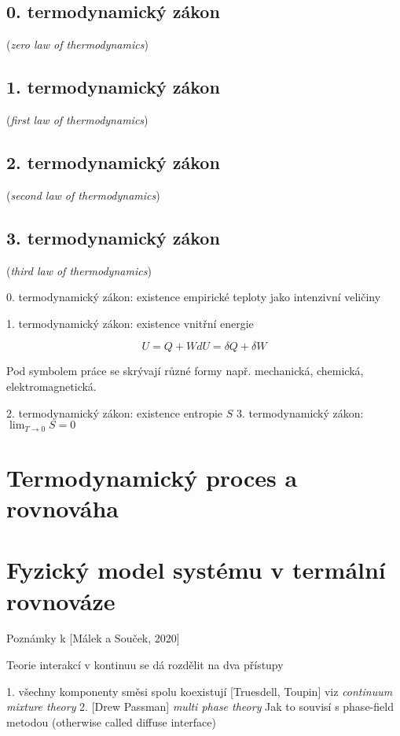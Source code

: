 \subsection{0. termodynamický zákon}

(\textit{zero law of thermodynamics})
    
\subsection{1. termodynamický zákon}

(\textit{first law of thermodynamics})

\subsection{2. termodynamický zákon}

(\textit{second law of thermodynamics})

\subsection{3. termodynamický zákon}

(\textit{third law of thermodynamics})

0. termodynamický zákon: existence empirické teploty jako intenzivní veličiny

1. termodynamický zákon: existence vnitřní energie 

$$
    U = Q + W 
    dU = \delta Q + \delta W
$$

Pod symbolem práce se skrývají různé formy např. mechanická, chemická, elektromagnetická.

2. termodynamický zákon: existence entropie $S$
3. termodynamický zákon: $\lim_{T \to 0} S = 0$

\section{Termodynamický proces a rovnováha}

\section{Fyzický model systému v termální rovnováze}

Poznámky k [Málek a Souček, 2020]

Teorie interakcí v kontinuu se dá rozdělit na dva přístupy

1. všechny komponenty směsi spolu koexistují [Truesdell, Toupin] viz \textit{continuum mixture theory}
2. [Drew Passman] \textit{multi phase theory}
    Jak to souvisí s phase-field metodou (otherwise called diffuse interface)

